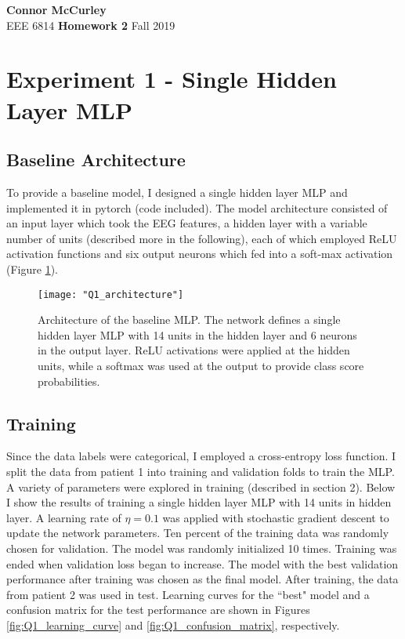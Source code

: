 \documentclass{article}[12 pt]
\begin{document}
	
\begin{center}
	\textbf{\Large Connor McCurley} \\
	EEE 6814 \qquad \textbf{\large Homework 2} \qquad Fall 2019 
\end{center}




\section*{Experiment 1 - Single Hidden Layer MLP}

\subsection*{Baseline Architecture}
To provide a baseline model, I designed a single hidden layer MLP and implemented it in pytorch (code included).  The model architecture consisted of an input layer which took the EEG features, a hidden layer with a variable number of units (described more in the following), each of which employed ReLU activation functions and six output neurons which fed into a soft-max activation (Figure \ref{fig:Q1_architecture}).  

\begin{center}
	\begin{figure}[H]
		\centering
		\texttt{[image: "Q1\_architecture"]}
		\caption{Architecture of the baseline MLP.  The network defines a single hidden layer MLP with 14 units in the hidden layer and 6 neurons in the output layer.  ReLU activations were applied at the hidden units, while a softmax was used at the output to provide  class score probabilities. }
		\label{fig:Q1_architecture}
	\end{figure}
\end{center}

\noindent
\subsection*{Training}
Since the data labels were categorical, I employed a cross-entropy loss function.  I split the data from patient 1 into training and validation folds to train the MLP.  A variety of parameters were explored in training (described in section 2).  Below I show the results of training a single hidden layer MLP with 14 units in hidden layer.  A learning rate of $\eta = 0.1$ was applied with stochastic gradient descent to update the network parameters.  Ten percent of the training data was randomly chosen for validation.  The model was randomly initialized 10 times. Training was ended when validation loss began to increase. The model with the best validation performance after training was chosen as the final model.  After training, the data from patient 2 was used in test.  Learning curves for the ``best" model and a confusion matrix for the test performance are shown in  Figures \ref{fig:Q1_learning_curve} and \ref{fig:Q1_confusion_matrix}, respectively.   
\end{document}
